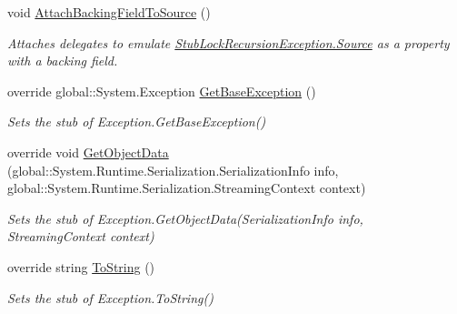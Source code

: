 \begin{DoxyCompactItemize}
void \hyperlink{class_system_1_1_threading_1_1_fakes_1_1_stub_lock_recursion_exception_af4e220e24e1c52b237515a523738da84}{Attach\-Backing\-Field\-To\-Source} ()
\begin{DoxyCompactList}\small\item\em Attaches delegates to emulate \hyperlink{class_system_1_1_threading_1_1_fakes_1_1_stub_lock_recursion_exception_aa19e449ed19bd048efd68e5d48a51442}{Stub\-Lock\-Recursion\-Exception.\-Source} as a property with a backing field.\end{DoxyCompactList}\item 
override global\-::\-System.\-Exception \hyperlink{class_system_1_1_threading_1_1_fakes_1_1_stub_lock_recursion_exception_a43ee7598806f9f10f4e7b7af09e0d39e}{Get\-Base\-Exception} ()
\begin{DoxyCompactList}\small\item\em Sets the stub of Exception.\-Get\-Base\-Exception()\end{DoxyCompactList}\item 
override void \hyperlink{class_system_1_1_threading_1_1_fakes_1_1_stub_lock_recursion_exception_acf6dd1c78b8639faeb4f3f15ae57367c}{Get\-Object\-Data} (global\-::\-System.\-Runtime.\-Serialization.\-Serialization\-Info info, global\-::\-System.\-Runtime.\-Serialization.\-Streaming\-Context context)
\begin{DoxyCompactList}\small\item\em Sets the stub of Exception.\-Get\-Object\-Data(\-Serialization\-Info info, Streaming\-Context context)\end{DoxyCompactList}\item 
override string \hyperlink{class_system_1_1_threading_1_1_fakes_1_1_stub_lock_recursion_exception_a5ec3d51a1c3a64489106929843490d70}{To\-String} ()
\begin{DoxyCompactList}\small\item\em Sets the stub of Exception.\-To\-String()\end{DoxyCompactList}\end{DoxyCompactItemize}
